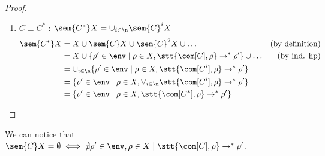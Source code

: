 \begin{proof}
\begin{enumerate}
  \item \(C \equiv C^*\) : \(\sem{C^*}X = \cup_{i\in\n}\sem{C}^i X\)
    \begin{align*}
      \sem{C^*}X & = X \cup \sem{C}X \cup \sem{C}^2X \cup \dots & \text{(by definition)}\\
      & = X \cup \{\rho' \in\env \mid \rho \in X, \stt{\com[C],\rho} \to^* \rho'\} \cup %
      \dots & \text{(by ind. hp)}\\
      & = \cup_{i\in\n} \{\rho' \in\env \mid \rho \in X, \stt{\com[C^i], \rho} \to^*  \rho'\} \\
      & = \{\rho' \in\env \mid \rho \in X, \vee_{i\in\n} \stt{\com[C^i], \rho} \to^* \rho'\} \\
      & = \{\rho' \in\env \mid \rho \in X, \stt{\com[C^*], \rho} \to^* \rho'\}
    \end{align*}
  \end{enumerate}
\end{proof}

We can notice that \(\sem{C}X = \emptyset \iff \nexists \rho'\in\env,
\rho \in X \mid \stt{\com[C],\rho} \to^* \rho'\).
